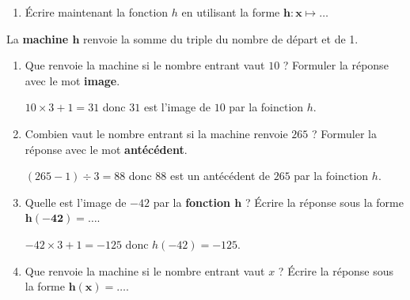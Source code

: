 \begin{exercice}
\begin{enumerate}
            \medskip
        \item Écrire maintenant la fonction $h$ en utilisant la forme $\boldsymbol{h:x} \longmapsto \ldots$
    \end{enumerate}
\end{exercice}
\begin{corrige}
    La \textbf{machine $\boldsymbol{h}$} renvoie la somme du triple du nombre de départ et de 1.

    \hspace*{-15mm}
      
    \begin{enumerate}
        \item Que renvoie la machine si le nombre entrant vaut $10$ ? Formuler la réponse avec le mot \textbf{image}.
        
        {\red $10\times 3 + 1 = 31$ donc $31$ est l'image de $10$ par la  foinction $h$.}
        \item Combien vaut le nombre entrant si la machine renvoie  $265$ ? Formuler la réponse avec le mot \textbf{antécédent}.
        
        {\red $(265-1)\div 3 = 88$ donc $88$ est un antécédent de $265$ par la  foinction $h$.}
        \item Quelle est l'image de $-42$ par la \textbf{fonction $\boldsymbol{h}$} ? Écrire la réponse sous la forme $\boldsymbol{h(-42)=\ldots}$.
        
        {\red $-42\times 3 + 1 = -125$ donc $h(-42)=-125$.}
        \item Que renvoie la machine si le nombre entrant vaut $x$ ? Écrire la réponse sous la forme $\boldsymbol{h(x)=\ldots}$.
        

\end{enumerate}
\end{corrige}
